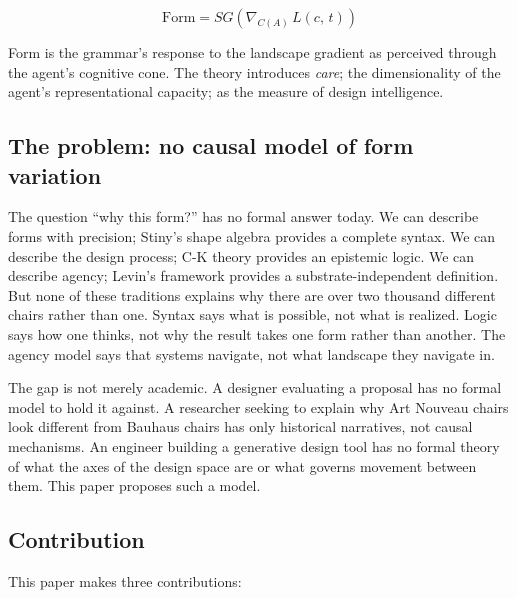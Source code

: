 \begin{equation*}
\mathrm{Form} = SG\!\left(\nabla_{C(A)}\, L(c,\, t)\right)
\end{equation*}

\noindent Form is the grammar's response to the landscape gradient as perceived through the agent's cognitive cone. The theory introduces \textit{care}; the dimensionality of the agent's representational capacity; as the measure of design intelligence.

\subsection{The problem: no causal model of form variation}

The question ``why this form?'' has no formal answer today. We can describe forms with precision; Stiny's shape algebra provides a complete syntax. We can describe the design process; C-K theory provides an epistemic logic. We can describe agency; Levin's framework provides a substrate-independent definition. But none of these traditions explains why there are over two thousand different chairs rather than one. Syntax says what is possible, not what is realized. Logic says how one thinks, not why the result takes one form rather than another. The agency model says that systems navigate, not what landscape they navigate in.

The gap is not merely academic. A designer evaluating a proposal has no formal model to hold it against. A researcher seeking to explain why Art Nouveau chairs look different from Bauhaus chairs has only historical narratives, not causal mechanisms. An engineer building a generative design tool has no formal theory of what the axes of the design space are or what governs movement between them. This paper proposes such a model.

\subsection{Contribution}

This paper makes three contributions:


